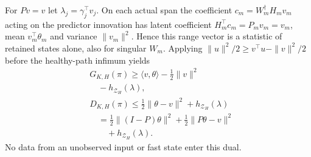 \documentclass[journal]{IEEEtran}
\begin{document}
For $Pv=v$ let $\lambda_j=\gamma_j^\top v_j$. On each actual span the
coefficient $c_m=W_m^\dagger H_mv_m$ acting on the predictor innovation has
latent coefficient $H_m^\top c_m=P_mv_m=v_m$, mean $v_m^\top\theta_m$
and variance $\|v_m\|^2$. Hence this range vector is a statistic of retained
states alone, also for singular $W_m$. Applying
$\|u\|^2/2\ge v^\top u-\|v\|^2/2$ before the healthy-path infimum yields
\begin{equation}\label{sf:dual}
\begin{aligned}
&G_{K,H}(\pi)\ge\langle v,\theta\rangle-\tfrac12\|v\|^2\\
&\quad-h_{\mathcal Z_H}(\lambda),\\
&D_{K,H}(\pi)\le\tfrac12\|\theta-v\|^2+h_{\mathcal Z_H}(\lambda)\\
&\quad=\tfrac12\|(I-P)\theta\|^2+\tfrac12\|P\theta-v\|^2\\
&\qquad+h_{\mathcal Z_H}(\lambda).
\end{aligned}
\end{equation}
No data from an unobserved input or fast state enter this dual.
\end{document}
